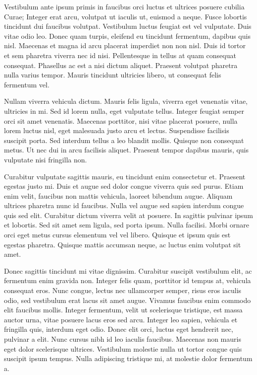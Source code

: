 Vestibulum ante ipsum primis in faucibus orci luctus et ultrices posuere cubilia Curae; Integer erat arcu, volutpat ut iaculis ut, euismod a neque.
Fusce lobortis tincidunt dui faucibus volutpat.
Vestibulum luctus feugiat est vel vulputate.
Duis vitae odio leo.
Donec quam turpis, eleifend eu tincidunt fermentum, dapibus quis nisl.
Maecenas et magna id arcu placerat imperdiet non non nisl.
Duis id tortor et sem pharetra viverra nec id nisi.
Pellentesque in tellus at quam consequat consequat.
Phasellus ac est a nisi dictum aliquet.
Praesent volutpat pharetra nulla varius tempor.
Mauris tincidunt ultricies libero, ut consequat felis fermentum vel.

Nullam viverra vehicula dictum.
Mauris felis ligula, viverra eget venenatis vitae, ultricies in mi.
Sed id lorem nulla, eget vulputate tellus.
Integer feugiat semper orci sit amet venenatis.
Maecenas porttitor, nisi vitae placerat posuere, nulla lorem luctus nisl, eget malesuada justo arcu et lectus.
Suspendisse facilisis suscipit porta.
Sed interdum tellus a leo blandit mollis.
Quisque non consequat metus.
Ut nec dui in arcu facilisis aliquet.
Praesent tempor dapibus mauris, quis vulputate nisi fringilla non.

Curabitur vulputate sagittis mauris, eu tincidunt enim consectetur et.
Praesent egestas justo mi.
Duis et augue sed dolor congue viverra quis sed purus.
Etiam enim velit, faucibus non mattis vehicula, laoreet bibendum augue.
Aliquam ultrices pharetra nunc id faucibus.
Nulla vel augue sed sapien interdum congue quis sed elit.
Curabitur dictum viverra velit at posuere.
In sagittis pulvinar ipsum et lobortis.
Sed sit amet sem ligula, sed porta ipsum.
Nulla facilisi.
Morbi ornare orci eget metus cursus elementum vel vel libero.
Quisque et ipsum quis est egestas pharetra.
Quisque mattis accumsan neque, ac luctus enim volutpat sit amet.

Donec sagittis tincidunt mi vitae dignissim.
Curabitur suscipit vestibulum elit, ac fermentum enim gravida non.
Integer felis quam, porttitor id tempus at, vehicula consequat eros.
Nunc congue, lectus nec ullamcorper semper, risus eros iaculis odio, sed vestibulum erat lacus sit amet augue.
Vivamus faucibus enim commodo elit faucibus mollis.
Integer fermentum, velit ut scelerisque tristique, est massa auctor urna, vitae posuere lacus eros sed arcu.
Integer leo sapien, vehicula et fringilla quis, interdum eget odio.
Donec elit orci, luctus eget hendrerit nec, pulvinar a elit.
Nunc cursus nibh id leo iaculis faucibus.
Maecenas non mauris eget dolor scelerisque ultrices.
Vestibulum molestie nulla ut tortor congue quis suscipit ipsum tempus.
Nulla adipiscing tristique mi, at molestie dolor fermentum a.

